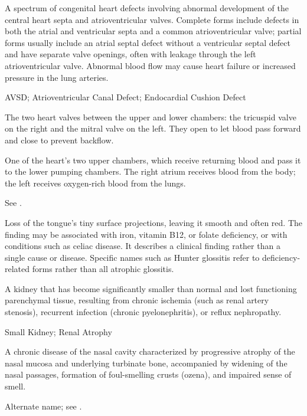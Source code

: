  A spectrum of congenital heart defects involving abnormal development of the central heart septa and atrioventricular valves. Complete forms include defects in both the atrial and ventricular septa and a common atrioventricular valve; partial forms usually include an atrial septal defect without a ventricular septal defect and have separate valve openings, often with leakage through the left atrioventricular valve. Abnormal blood flow may cause heart failure or increased pressure in the lung arteries.

\synonyms
AVSD; Atrioventricular Canal Defect; Endocardial Cushion Defect

 The two heart valves between the upper and lower chambers: the tricuspid valve on the right and the mitral valve on the left. They open to let blood pass forward and close to prevent backflow.

 One of the heart’s two upper chambers, which receive returning blood and pass it to the lower pumping chambers. The right atrium receives blood from the body; the left receives oxygen-rich blood from the lungs.

 See .

 Loss of the tongue's tiny surface projections, leaving it smooth and often red.
The finding may be associated with iron, vitamin B12, or folate deficiency, or with conditions such as celiac disease.
It describes a clinical finding rather than a single cause or disease.
Specific names such as Hunter glossitis refer to deficiency-related forms rather than all atrophic glossitis.

 A kidney that has become significantly smaller than normal and lost functioning parenchymal tissue, resulting from chronic ischemia (such as renal artery stenosis), recurrent infection (chronic pyelonephritis), or reflux nephropathy.

\synonyms
Small Kidney; Renal Atrophy

 A chronic disease of the nasal cavity characterized by progressive atrophy of the nasal mucosa and underlying turbinate bone, accompanied by widening of the nasal passages, formation of foul-smelling crusts (ozena), and impaired sense of smell.

 Alternate name; see .

